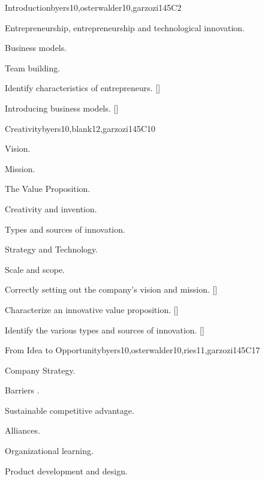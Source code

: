 \begin{syllabus}
\begin{unit}{}{Introduction}{byers10,osterwalder10,garzozi14}{5}{C2}
\begin{topics}
    \item Entrepreneurship, entrepreneurship and technological innovation.
    \item Business models.
    \item Team building.
\end{topics}

\begin{learningoutcomes} 
    \item Identify characteristics of entrepreneurs. [\Familiarity]
    \item Introducing business models. [\Familiarity]
\end{learningoutcomes} 
\end{unit}
   
\begin{unit}{}{Creativity}{byers10,blank12,garzozi14}{5}{C10}
    \begin{topics}
      \item Vision.
      \item Mission.
      \item The Value Proposition.
      \item Creativity and invention.
      \item Types and sources of innovation.
      \item Strategy and Technology.
      \item Scale and scope.
    \end{topics}

    \begin{learningoutcomes} 
      \item Correctly setting out the company's vision and mission. [\Usage]
      \item Characterize an innovative value proposition. [\Assessment]
      \item Identify the various types and sources of innovation. [\Familiarity]
    \end{learningoutcomes} 
\end{unit}
   
\begin{unit}{}{From Idea to Opportunity}{byers10,osterwalder10,ries11,garzozi14}{5}{C17}
\begin{topics}
    \item Company Strategy.
    \item Barriers .
    \item Sustainable competitive advantage.
    \item Alliances.
    \item Organizational learning.
    \item Product development and design.
\end{topics}


\end{unit}
\end{syllabus}
